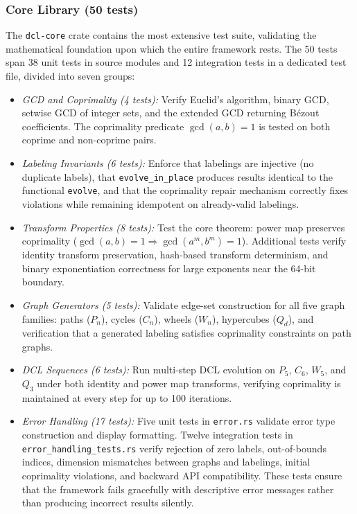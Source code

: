 \documentclass[lettersize,journal]{IEEEtran}
\begin{document}
\subsubsection{Core Library (50 tests)}
The \texttt{dcl-core} crate contains the most extensive test suite, validating the mathematical foundation upon which the entire framework rests. The 50 tests span 38 unit tests in source modules and 12 integration tests in a dedicated test file, divided into seven groups:

\begin{itemize}
\item \emph{GCD and Coprimality (4 tests):} Verify Euclid's algorithm, binary GCD, setwise GCD of integer sets, and the extended GCD returning B\'{e}zout coefficients. The coprimality predicate $\gcd(a,b) = 1$ is tested on both coprime and non-coprime pairs.

\item \emph{Labeling Invariants (6 tests):} Enforce that labelings are injective (no duplicate labels), that \texttt{evolve\_in\_place} produces results identical to the functional \texttt{evolve}, and that the coprimality repair mechanism correctly fixes violations while remaining idempotent on already-valid labelings.

\item \emph{Transform Properties (8 tests):} Test the core theorem: power map preserves coprimality ($\gcd(a,b) = 1 \Rightarrow \gcd(a^m, b^m) = 1$). Additional tests verify identity transform preservation, hash-based transform determinism, and binary exponentiation correctness for large exponents near the 64-bit boundary.

\item \emph{Graph Generators (5 tests):} Validate edge-set construction for all five graph families: paths ($P_n$), cycles ($C_n$), wheels ($W_n$), hypercubes ($Q_d$), and verification that a generated labeling satisfies coprimality constraints on path graphs.

\item \emph{DCL Sequences (6 tests):} Run multi-step DCL evolution on $P_5$, $C_6$, $W_5$, and $Q_3$ under both identity and power map transforms, verifying coprimality is maintained at every step for up to 100 iterations.

\item \emph{Error Handling (17 tests):} Five unit tests in \texttt{error.rs} validate error type construction and display formatting. Twelve integration tests in \texttt{error\_handling\_tests.rs} verify rejection of zero labels, out-of-bounds indices, dimension mismatches between graphs and labelings, initial coprimality violations, and backward API compatibility. These tests ensure that the framework fails gracefully with descriptive error messages rather than producing incorrect results silently.
\end{itemize}
\end{document}
